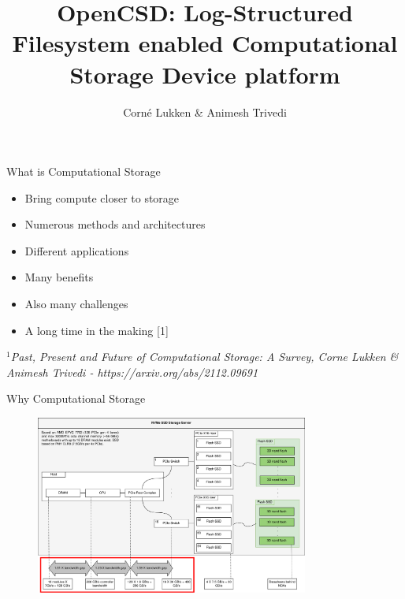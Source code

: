 \documentclass{beamer}
\author{Corné Lukken \& Animesh Trivedi}
\title{OpenCSD: Log-Structured Filesystem enabled Computational Storage Device
platform}
\begin{document}
\frame{\titlepage}
\begin{frame}{What is Computational Storage}
	\begingroup
	\small
	\begin{itemize}
		\item Bring compute closer to storage
		\item Numerous methods and architectures %
		\item Different applications %
		\item Many benefits %
		\item Also many challenges %
		\item A long time in the making [1] %
	\end{itemize}
	\textit{\tiny $^{1}$Past, Present and Future of Computational Storage: A
	Survey, Corne Lukken \& Animesh Trivedi - https://arxiv.org/abs/2112.09691}
	\endgroup
\end{frame}

\begin{frame}{Why Computational Storage}
	\begingroup
	\small
	\begin{figure}
	   \centering
	   \includegraphics[width=0.8\textwidth]{resources/images/storage-bottleneck.png}
	\end{figure}
	\endgroup
\end{frame}
\end{document}
